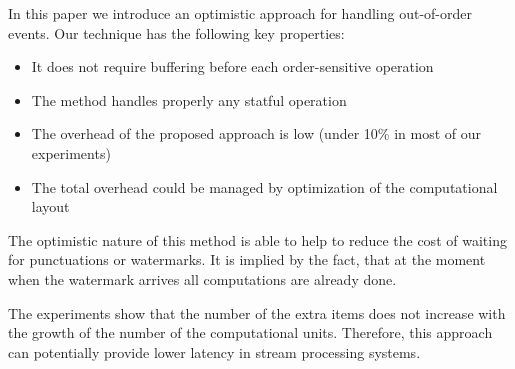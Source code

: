 
\label {fs-conclusion}

In this paper we introduce an optimistic approach for handling out-of-order events. Our technique has the following key properties:

\begin{itemize}
    \item It does not require buffering before each order-sensitive operation
    \item The method handles properly any statful operation
    \item The overhead of the proposed approach is low (under 10\% in most of our experiments)
    \item The total overhead could be managed by optimization of the computational layout
\end{itemize}

The optimistic nature of this method is able to help to reduce the cost of waiting for punctuations or watermarks. It is implied by the fact, that at the moment when the watermark arrives all computations are already done. 

The experiments show that the number of the extra items does not increase with the growth of the number of the computational units. Therefore, this approach can potentially provide lower latency in stream processing systems.
